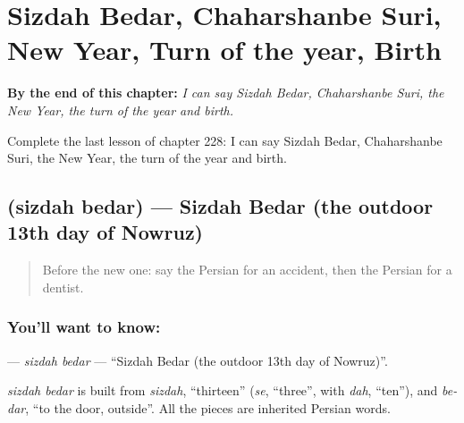 
\chapter{Sizdah Bedar, Chaharshanbe Suri, New Year, Turn of the year, Birth}
\label{ch:fa-sizdah-bedar-chaharshanbe-suri-new-year-turn-of-the-year-birth}

\begin{chapteropening}
\textbf{By the end of this chapter:} \emph{I can say Sizdah Bedar, Chaharshanbe Suri, the New Year, the turn of the year and birth.}

Complete the last lesson of chapter 228: I can say Sizdah Bedar, Chaharshanbe Suri, the New Year, the turn of the year and birth.
\end{chapteropening}

\section[\texorpdfstring{\fa{سیزده} \fa{بدر} (sizdah bedar)}{سیزده بدر (sizdah bedar)}]{  (sizdah bedar) — Sizdah Bedar (the outdoor 13th day of Nowruz)}

\label{lesson:FA-C228-sizdah-bedar}



\begin{quote}
Before the new one: say the Persian for an accident, then the Persian for a dentist.
\end{quote}

\subsection*{You'll want to know:  }
\textbf{ } — \emph{sizdah bedar} — \textquotedblleft{}Sizdah Bedar (the outdoor 13th day of Nowruz)\textquotedblright{}.

\begin{cousinweb}
\emph{sizdah bedar} is built from \emph{sizdah}, \textquotedblleft{}thirteen\textquotedblright{} (\emph{se}, \textquotedblleft{}three\textquotedblright{}, with \emph{dah}, \textquotedblleft{}ten\textquotedblright{}), and \emph{be-dar}, \textquotedblleft{}to the door, outside\textquotedblright{}. All the pieces are inherited Persian words.
\end{cousinweb}

